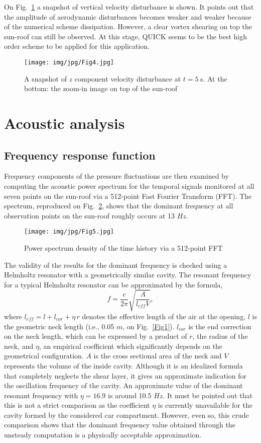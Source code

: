 \documentclass[10pt]{article}
\theoremstyle{plain}
\theoremstyle{definition}
\theoremstyle{remark}
\begin{document}
On Fig.~\ref{Fig4} a snapshot of vertical velocity disturbance is shown.
It points out that the amplitude of aerodynamic disturbances becomes weaker and weaker because of the numerical scheme dissipation.
However, a clear vortex shearing on top the sun-roof can still be observed.
At this stage, QUICK seems to be the best high order scheme to be applied for this application.
%
\begin{figure}[htbp]
\centering
\texttt{[image: img/jpg/Fig4.jpg]}
\caption{A snapshot of $z$ component velocity disturbance at $t = 5\,s$. At the bottom: the zoom-in image on top of the sun-roof}\label{Fig4}
\end{figure}
%


\section{Acoustic analysis}

\subsection{Frequency response function}

Frequency components of the pressure fluctuations are then examined by computing the acoustic power spectrum for the temporal signals monitored at all seven points on the sun-roof via a 512-point Fast Fourier Transform (FFT).
The spectrum, reproduced on Fig.~\ref{Fig5}, shows that the dominant frequency at all observation points on the sun-roof roughly occurs at 13 $Hz$.
%
\begin{figure}[htbp]
\centering
\texttt{[image: img/jpg/Fig5.jpg]}
\caption{Power spectrum density of the time history via a 512-point FFT}\label{Fig5}
\end{figure}
%
The validity of the results for the dominant frequency is checked using a Helmholtz resonator with a geometrically similar cavity.
The resonant frequency for a typical Helmholtz resonator can be approximated by the formula, 
%
$$
\displaystyle{ f = \frac{c}{2 \pi}\sqrt{\frac{A}{l_{eff}V}}},
$$
%
where $l_{eff} = l + l_{cor} + \eta \, r$ denotes the effective length of the air at the opening, $l$ is the geometric neck length (i.e., 0.05 $m$, on Fig.~\ref{Fig1}).
$l_{cor}$ is the end correction on the neck length, which can be expressed by a product of $r$, the radius of the neck, and $\eta$, an empirical coefficient which significantly depends on the geometrical configuration.
$A$ is the cross sectional area of the neck and $V$ represents the volume of the inside cavity.
Although it is an idealized formula that completely neglects the shear layer, it gives an approximate indication for the oscillation frequency of the cavity.
An approximate value of the dominant resonant frequency with $\eta = 16.9$ is around 10.5 $Hz$.
It must be pointed out that this is not a strict comparison as the coefficient $\eta$ is currently unavailable for the cavity formed by the considered car compartment.
However, even so, this crude comparison shows that the dominant frequency value obtained through the unsteady computation is a physically acceptable approximation.
\end{document}
